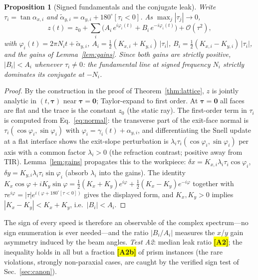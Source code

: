 \documentclass[twocolumn,preprintnumbers,amsmath,amssymb,pra,floatfix]{revtex4-2}
\newcommand{\vect}[1]{\bm{#1}}
\newcommand{\bigO}{\mathcal{O}}
\newtheorem{proposition}{Proposition}
\newcommand{\PH}[1]{\colorbox{yellow}{\textbf{\small [#1]}}}
\begin{document}
\begin{proposition}[Signed fundamentals and the conjugate leak]
\label{prop:leak}
Write $\tau_i=\tan\alpha_{x,i}$ and
$\tilde\alpha_{y,i}=\alpha_{y,i}+180^\circ[\tau_i<0]$.  As
$\max_j|\tau_j|\to0$,
\begin{equation}
  z(t) = z_0+\sum_{i}\bigl(
        A_i\,e^{i\varphi_i(t)}
      + B_i\,e^{-i\varphi_i(t)}\bigr)+\bigO(\tau^{2}),
\end{equation}
with $\varphi_i(t)=2\pi N_i t+\tilde\alpha_{y,i}$,
$A_i=\tfrac12(K_{x,i}+K_{y,i})\,|\tau_i|$,
$B_i=\tfrac12(K_{x,i}-K_{y,i})\,|\tau_i|$, and the gains of
Lemma~\ref{lem:gains}.  Since both gains are strictly positive,
$|B_i|<A_i$ whenever $\tau_i\neq0$: the fundamental line at signed
frequency $N_i$ strictly dominates its conjugate at $-N_i$.
\end{proposition}
\begin{proof}
By the construction in the proof of Theorem~\ref{thm:lattice}, $z$ is
jointly analytic in $(t,\vect{\tau})$ near $\vect{\tau}=\vect{0}$;
Taylor-expand to first order.  At $\vect{\tau}=\vect{0}$ all faces
are flat and the trace is the constant $z_0$ (the static ray).  The
first-order term in $\tau_i$ is computed from
Eq.~\eqref{eq:normal}: the transverse part of the exit-face normal is
$\tau_i(\cos\varphi_i,\sin\varphi_i)$ with
$\varphi_i=\gamma_i(t)+\alpha_{y,i}$, and differentiating the Snell
update at a flat interface shows the exit-slope perturbation is
$\lambda_i\tau_i(\cos\varphi_i,\sin\varphi_i)$ per axis with a common
factor $\lambda_i>0$ (the refraction contrast; positive away from
TIR).  Lemma~\ref{lem:gains} propagates this to the workpiece:
$\delta x=K_{x,i}\lambda_i\tau_i\cos\varphi_i$,
$\delta y=K_{y,i}\lambda_i\tau_i\sin\varphi_i$ (absorb $\lambda_i$
into the gains).  The identity
$K_x\cos\varphi+iK_y\sin\varphi
=\tfrac12(K_x{+}K_y)e^{i\varphi}+\tfrac12(K_x{-}K_y)e^{-i\varphi}$
together with $\tau e^{i\varphi}=|\tau|e^{i(\varphi+180^\circ[\tau<0])}$
gives the displayed form, and $K_x,K_y>0$ implies
$|K_x-K_y|<K_x+K_y$, i.e.\ $|B_i|<A_i$.
\end{proof}

The sign of every speed is therefore an observable of the complex
spectrum---no sign enumeration is ever needed---and the ratio
$|B_i/A_i|$ measures the $x$/$y$ gain asymmetry induced by the beam
angles.  \emph{Test A2}: median leak ratio \PH{A2}; the inequality
holds in all but a fraction \PH{A2b} of prism instances (the rare
violations, strongly non-paraxial cases, are caught by the verified
sign test of Sec.~\ref{sec:canon}).
\end{document}
